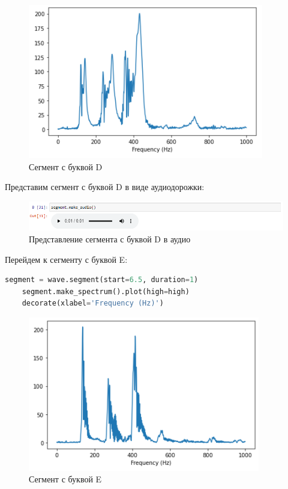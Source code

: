 \documentclass[a4paper]{article}
\begin{document}
             \begin{figure}[H]
                \centering
                \includegraphics{ex_6_letter_d_segment.png}
                \caption{Сегмент с буквой D}
                \label{fig:ex_6_letter_d_segment}
            \end{figure}
            
            Представим сегмент с буквой D в виде аудиодорожки:
            
            \begin{figure}[H]
                \centering
                \includegraphics[width=\textwidth]{ex_6_letter_d_audio.png}
                \caption{Представление сегмента с буквой D в аудио}
                \label{fig:ex_6_letter_d_audio}
            \end{figure}
            
             Перейдем к сегменту с буквой E:
            
\begin{lstlisting}[language=Python, caption= Сегмент с буквой E]
    segment = wave.segment(start=6.5, duration=1)
    segment.make_spectrum().plot(high=high)
    decorate(xlabel='Frequency (Hz)')
\end{lstlisting}   
            
             \begin{figure}[H]
                \centering
                \includegraphics{ex_6_letter_e_segment.png}
                \caption{Сегмент с буквой E}
                \label{fig:ex_6_letter_e_segment}
            \end{figure}
            
\end{document}
